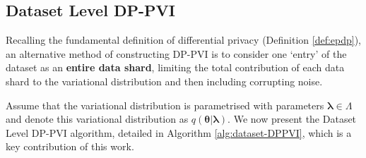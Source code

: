 \subsection{Dataset Level DP-PVI}
Recalling the fundamental definition of differential privacy (Definition \ref{def:epdp}), an alternative method of constructing DP-PVI is to consider one `entry' of the dataset as an \textbf{entire data shard}, limiting the total contribution of each data shard to the variational distribution and then including corrupting noise. 

Assume that the variational distribution is parametrised with parameters $\bm{\lambda} \in \Lambda$ and denote this variational distribution as $q(\bm{\theta}| \bm{\lambda})$. We now present the Dataset Level DP-PVI algorithm, detailed in Algorithm \ref{alg:dataset-DPPVI}, which is a key contribution of this work.

